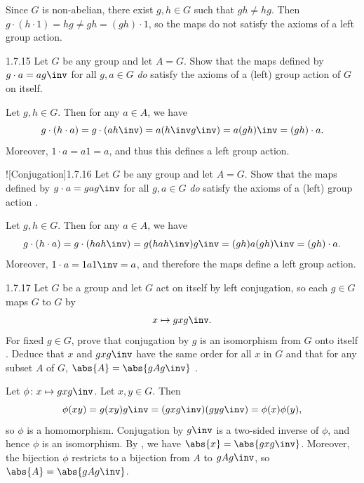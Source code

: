 \begin{sol}
    Since $G$ is non-abelian, there exist $g, h \in G$ such that $gh \neq hg$.
    Then $g \cdot (h \cdot 1) = hg \neq gh = (gh) \cdot 1$, so the maps do not satisfy the axioms of a left group action.
\end{sol}

\begin{exercise}{1.7.15}
    Let $G$ be any group and let $A = G$.
	Show that the maps defined by $g \cdot a = ag\inv$ for all $g, a \in G$ \emph{do} satisfy the axioms of a (left) group action of $G$ on itself.
\end{exercise}

\begin{sol}
    Let $g, h \in G$.
	Then for any $a \in A$, we have
    \[
    	g \cdot (h \cdot a) = g \cdot (ah\inv) = a(h\inv g\inv) = a(gh)\inv = (gh) \cdot a.
    \]
    Moreover, $1 \cdot a = a1 = a$, and thus this defines a left group action.
\end{sol}

\begin{exercise}![Conjugation]{1.7.16}
    Let $G$ be any group and let $A = G$.
	Show that the maps defined by $g \cdot a = gag\inv$ for all $g, a \in G$ \emph{do} satisfy the axioms of a (left) group action .
\end{exercise}

\begin{sol}
    Let $g, h \in G$.
	Then for any $a \in A$, we have
    \[
    	g \cdot (h \cdot a) = g \cdot (hah\inv) = g(hah\inv)g\inv = (gh)a(gh)\inv = (gh) \cdot a.
    \]
    Moreover, $1 \cdot a = 1a1\inv = a$, and therefore the maps define a left group action.
\end{sol}

\begin{exercise}{1.7.17}
    Let $G$ be a group and let $G$ act on itself by left conjugation, so each $g\in G$ maps $G$ to $G$ by
    \[
    	 x \mapsto gxg\inv. 
    \]
    For fixed $g\in G$, prove that conjugation by $g$ is an isomorphism from $G$ onto itself .
	Deduce that $x$ and $gxg\inv$ have the same order for all $x$ in $G$ and that for any subset $A$ of $G$, $\abs{A} = \abs{gAg\inv}$ .
\end{exercise}

\begin{sol}
    Let $\phi \colon x \mapsto gxg\inv$.
	Let $x, y \in G$.
	Then
    \[
    	\phi(x y) = g(xy)g\inv = (gxg\inv)(gyg\inv) = \phi(x)\phi(y),
    \]
    so $\phi$ is a homomorphism.
    Conjugation by $g\inv$ is a two-sided inverse of $\phi$, and hence $\phi$ is an isomorphism.
    By , we have $\abs{x} = \abs{gxg\inv}$.
	Moreover, the bijection $\phi$ restricts to a bijection from $A$ to $gAg\inv$, so $\abs{A} = \abs{gAg\inv}$.
\end{sol}

